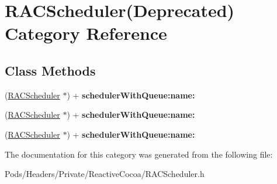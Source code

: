 \hypertarget{category_r_a_c_scheduler_07_deprecated_08}{}\section{R\+A\+C\+Scheduler(Deprecated) Category Reference}
\label{category_r_a_c_scheduler_07_deprecated_08}
\subsection*{Class Methods}
\begin{DoxyCompactItemize}
\item 
\mbox{\label{category_r_a_c_scheduler_07_deprecated_08_a106be2765ef5f6b5738f5d84808d7f7c}} 
(\mbox{\hyperlink{interface_r_a_c_scheduler}{R\+A\+C\+Scheduler}} $\ast$) + {\bfseries scheduler\+With\+Queue\+:name\+:}
\item 
\mbox{\label{category_r_a_c_scheduler_07_deprecated_08_a106be2765ef5f6b5738f5d84808d7f7c}} 
(\mbox{\hyperlink{interface_r_a_c_scheduler}{R\+A\+C\+Scheduler}} $\ast$) + {\bfseries scheduler\+With\+Queue\+:name\+:}
\item 
\mbox{\label{category_r_a_c_scheduler_07_deprecated_08_a106be2765ef5f6b5738f5d84808d7f7c}} 
(\mbox{\hyperlink{interface_r_a_c_scheduler}{R\+A\+C\+Scheduler}} $\ast$) + {\bfseries scheduler\+With\+Queue\+:name\+:}
\end{DoxyCompactItemize}


The documentation for this category was generated from the following file\+:\begin{DoxyCompactItemize}
\item 
Pods/\+Headers/\+Private/\+Reactive\+Cocoa/R\+A\+C\+Scheduler.\+h\end{DoxyCompactItemize}
